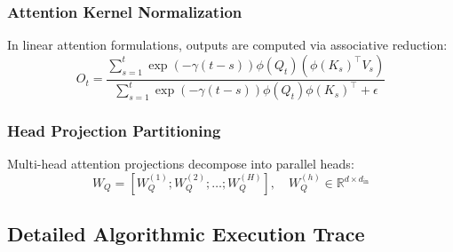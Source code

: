 \subsubsection{Attention Kernel Normalization}
In linear attention formulations, outputs are computed via associative reduction:
\begin{equation}
O_t = \frac{\sum_{s=1}^{t} \exp(-\gamma (t-s)) \phi(Q_t) (\phi(K_s)^\top V_s)}{\sum_{s=1}^{t} \exp(-\gamma (t-s)) \phi(Q_t) \phi(K_s)^\top + \epsilon}
\end{equation}

\subsubsection{Head Projection Partitioning}
Multi-head attention projections decompose into parallel heads:
\begin{equation}
W_Q = [W_Q^{(1)}; W_Q^{(2)}; \dots; W_Q^{(H)}], \quad W_Q^{(h)} \in \mathbb{R}^{d \times d_{\text{in}}}
\end{equation}

\subsection{Detailed Algorithmic Execution Trace}

